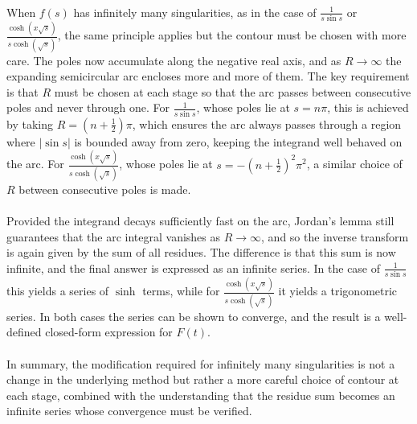 \\
When $f(s)$ has infinitely many singularities, as in the case of $\frac{1}{s \sin s}$ or $\frac{\cosh(x\sqrt{s})}{s \cosh(\sqrt{s})}$, the same principle applies but the contour must be chosen with more care. The poles now accumulate along the negative real axis, and as $R \to \infty$ the expanding semicircular arc encloses more and more of them. The key requirement is that $R$ must be chosen at each stage so that the arc passes between consecutive poles and never through one. For $\frac{1}{s\sin s}$, whose poles lie at $s = n\pi$, this is achieved by taking $R = \left(n + \frac{1}{2}\right)\pi$, which ensures the arc always passes through a region where $|\sin s|$ is bounded away from zero, keeping the integrand well behaved on the arc. For $\frac{\cosh(x\sqrt{s})}{s\cosh(\sqrt{s})}$, whose poles lie at $s = -\left(n + \frac{1}{2}\right)^2\pi^2$, a similar choice of $R$ between consecutive poles is made.
\\
\\
Provided the integrand decays sufficiently fast on the arc, Jordan's lemma still guarantees that the arc integral vanishes as $R \to \infty$, and so the inverse transform is again given by the sum of all residues. The difference is that this sum is now infinite, and the final answer is expressed as an infinite series. In the case of $\frac{1}{s\sin s}$ this yields a series of $\sinh$ terms, while for $\frac{\cosh(x\sqrt{s})}{s\cosh(\sqrt{s})}$ it yields a trigonometric series. In both cases the series can be shown to converge, and the result is a well-defined closed-form expression for $F(t)$.
\\
\\
In summary, the modification required for infinitely many singularities is not a change in the underlying method but rather a more careful choice of contour at each stage, combined with the understanding that the residue sum becomes an infinite series whose convergence must be verified. \cite{widder1941,doetsch1974, TransformsTheory}
\\

